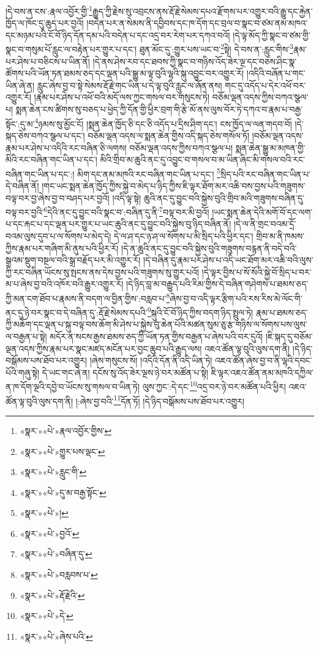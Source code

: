 །དེ་བས་ན་ངས་:རྣལ་འབྱོར་གྱི་\footnote{«སྣར་»«པེ་»རྣལ་འབྱོར་གྱིས་}རྒྱུད་ཀྱི་རྗེས་སུ་འབྲངས་ནས་རྡོ་རྗེ་སེམས་དཔའ་རྫོགས་པར་འགྱུར་བའི་རྒྱུ་དང་རྐྱེན་ཁྱོད་ལ་ཁོང་དུ་ཆུད་པར་བྱའོ། །བདེན་པར་ན་སེམས་ནི་དབྱིབས་དང་ཁ་དོག་དང་བྲལ་བ་སྣང་བ་ཙམ་ནམ་མཁའ་དང་མཉམ་པའི་ངོ་བོ་ཉིད་དོན་དམ་པའི་བདེན་པ་དང་འདྲ་བར་རེག་པར་དཀའ་བའོ། །དེ་ལྟ་མོད་ཀྱི་སྣང་བ་ཙམ་གྱི་སྣང་བ་གསུམ་པོ་རླུང་ལ་བརྟེན་པར་གྱུར་པ་དང་། ཐུན་མོང་དུ་:གྱུར་པས་ཡང་བ་\footnote{«སྣར་»«པེ་»གྱུར་པས་ལྡང་}སྟེ། དེ་བས་ན་:རླུང་གིས་\footnote{«སྣར་»«པེ་»རླུང་གི་}རྣམ་པར་ཤེས་པ་བཅིངས་པ་ཡིན་ནོ། །དེ་ནས་ཤེས་རབ་དང་ཐབས་ཀྱི་སྣང་བ་གཉིས་འོད་ཟེར་ལྔ་དང་བཅས་ཤིང་སྣ་ཚོགས་པའི་ཡོན་ཏན་ཐམས་ཅད་དང་ལྡན་པའི་སྒྱུ་མ་ལྟ་བུའི་ལྷའི་སྐུ་འབྱུང་བར་འགྱུར་རོ། །འདིའི་བཞོན་པ་གང་ཡིན་ཞེ་ན། རླུང་ཞེས་བྱ་བ་སྟེ་སེམས་རྡོ་རྗེ་གང་ཡིན་པ་དེ་ལྟ་བུའི་རླུང་ལ་ཞོན་ནས། གང་དུ་འདོད་པ་དེར་འཕོ་བར་འགྱུར་རོ། །རྣམ་པར་ཤེས་པ་འཕོ་བའི་མདོ་ལས་ཀྱང་གསལ་བར་གསུངས་ཏེ། བཅོམ་ལྡན་འདས་ཀྱིས་བཀའ་སྩལ་པ། སྨན་ཆེན་ངས་ཚིགས་སུ་བཅད་པ་ཕྱེད་ཀྱི་དོན་གྱི་ཕྱིར་བྲག་གི་རྩེ་མོ་ནས་ལུས་བོར་ཏེ་དཀའ་བ་རྣམ་པ་བརྒྱ་སྟོང་:དུ་མ་\footnote{«སྣར་»«པེ་»དུ་མ་བརྒྱ་སྟོང་}ཉམས་སུ་མྱོང་ངོ། །སྨན་ཆེན་ཁྱོད་ཅི་དང་ཅི་འདོད་པ་དྲིས་ཤིག་དང་། ངས་ཁྱོད་ལ་ལན་གདབ་བོ། །དེ་སྐད་ཅེས་བཀའ་སྩལ་པ་དང་། བཅོམ་ལྡན་འདས་ལ་སྨན་ཆེན་གྱིས་འདི་སྐད་ཅེས་གསོལ་ཏོ། །བཅོམ་ལྡན་འདས་རྣམ་པར་ཤེས་པ་འདིའི་རང་བཞིན་ཅི་ལགས། བཅོམ་ལྡན་འདས་ཀྱིས་བཀའ་སྩལ་པ། སྨན་ཆེན་སྒྱུ་མ་མཁན་གྱི་མིའི་རང་བཞིན་གང་ཡིན་པ་དང་། མིའི་གྲིབ་མ་ཆུའི་ནང་དུ་འབྱུང་བ་གསལ་བ་མ་ཡིན་ཞིང་མི་གསལ་བའི་རང་བཞིན་གང་ཡིན་པ་དང་:། མིག་དང་ནམ་མཁའི་རང་བཞིན་གང་ཡིན་པ་དང་། \footnote{«སྣར་»«པེ་»།  }སྲིད་པའི་རང་བཞིན་གང་ཡིན་པ་དེ་བཞིན་ནོ། །གང་ཡང་སྨན་ཆེན་ཁྱོད་ཀྱིས་སྐྱེ་བ་མེད་པ་ཉིད་ཀྱིས་ཇི་ལྟར་ཐོག་མར་འཆི་བས་བྱས་པའི་གཟུགས་བལྟ་བར་བྱ་ཞེས་བྱ་བ་བཤད་པར་བྱའོ། །འདི་ལྟ་སྟེ། ཆུའི་ནང་དུ་བྱུང་བའི་སྐྱེས་བུའི་གྲིབ་མའི་གཟུགས་བཞིན་དུ་བལྟ་བར་བྱའི་\footnote{«སྣར་»«པེ་»བྱའོ་}དེའི་ནང་དུ་བྱུང་བའི་སྣང་བ་:བཞིན་དུ་ནི་\footnote{«སྣར་»«པེ་»བཞིན་དུ་}བལྟ་བར་མི་བྱའོ། །ཡང་སྨན་ཆེན་དེའི་མགོ་བོ་དང་ལག་པ་དང་རྐང་པ་དང་ལྡན་པར་གྱུར་པ་ཡང་ཆུའི་ནང་དུ་བྱུང་བའི་སྐྱེས་བུ་ཉིད་བཞིན་ནོ། །དེ་ལ་ནི་གྲང་བའམ་དྲོ་བའམ་ལུས་དུབ་པ་ལ་སོགས་པ་མེད་དེ། དེ་ལ་ཤ་དང་ཉ་ཤ་ལ་སོགས་པ་མི་སྲིད་པའི་ཕྱིར་དང་། གྲིབ་མ་ནི་ཁམས་ཀྱིས་རྣམ་པར་གཞིག་མི་ནུས་པའི་ཕྱིར་རོ། །དེ་ན་ཆུའི་ནང་དུ་བྱུང་བའི་སྐྱེས་བུའི་གཟུགས་བརྙན་ནི་བདེ་བའི་སྒྲའམ་སྡུག་བསྔལ་བའི་སྒྲ་བརྗོད་པར་མི་འགྱུར་རོ། །དེ་བཞིན་དུ་རྣམ་པར་ཤེས་པ་འདི་ཡང་ཐོག་མར་འཆི་བའི་ལུས་ཀྱི་རང་བཞིན་ཡོངས་སུ་སྤངས་ནས་དེས་བྱས་པའི་གཟུགས་སུ་གྱུར་པའོ། །དེ་ལྟར་བྱིས་པ་སོ་སོའི་སྐྱེ་བོ་སྲིད་པ་བར་མ་པ་ཞེས་བྱ་བའི་འཁོར་བའི་རྒྱུར་འགྱུར་རོ། །དེ་ཉིད་བླ་མ་བརྒྱུད་པའི་རིམ་གྱིས་དེ་བཞིན་གཤེགས་པ་ཐམས་ཅད་ཀྱི་མན་ངག་ཐོབ་པ་རྣམས་ནི་བདག་ལ་བྱིན་གྱིས་:བརླབ་པ་\footnote{«སྣར་»«པེ་»བརླབས་པ་}ཞེས་བྱ་བ་འདི་ལྟར་རྩིག་པའི་རས་རིས་མེ་ལོང་གི་ནང་དུ་ཉེ་བར་སྣང་བ་དེ་བཞིན་དུ་:རྡོ་རྗེ་སེམས་དཔའི་\footnote{«སྣར་»«པེ་»རྡོ་རྗེའི་}སྐུའི་ངོ་བོ་ཉིད་ཀྱིས་བདག་ཉིད་སྤྲུལ་ཏེ། རྣམ་པ་ཐམས་ཅད་ཀྱི་མཆོག་དང་ལྡན་པ་སྐུ་བལྟ་བས་ཆོག་མི་ཤེས་པ་སྐྱེས་བུ་ཆེན་པོའི་མཚན་སུམ་ཅུ་རྩ་གཉིས་ལ་སོགས་པས་ལུས་ལ་བརྒྱན་པ་སྟེ། མདོར་ན་སངས་རྒྱས་ཐམས་ཅད་ཀྱི་ཡོན་ཏན་གྱིས་བརྒྱན་པ་ཞེས་པའི་བར་དུའོ། །ཇི་སྐད་དུ་བཅོམ་ལྡན་འདས་ཀྱིས་རྣམ་པར་སྣང་མཛད་མངོན་པར་བྱང་ཆུབ་པའི་རྒྱུད་ལས། འཇའ་ཚོན་ལྟ་བུའི་ལུས་དག་ནི། །དེ་ཉིད་བསྒོམས་པས་ཐོབ་པར་འགྱུར། །ཞེས་གསུངས་སོ། །འདིའི་དོན་ནི་འདི་ཡིན་ཏེ། འཇའ་ཚོན་ཞེས་བྱ་བ་ནི་ལྷའི་དབང་པོའི་གཞུ་སྟེ། དེ་ཡང་གང་ཞེ་ན། དངོས་སུ་འོད་ཟེར་ལྔས་ཉེ་བར་མཚོན་པ་སྟེ། ཇི་ལྟར་འཇའ་ཚོན་ནམ་མཁའི་དཀྱིལ་ན་ཁ་དོག་ལྔའི་དབྱེ་བ་ཡོངས་སུ་གསལ་བ་ཡིན་ཏེ། ལུས་ཀྱང་:དེ་དང་\footnote{«སྣར་»«པེ་»དེ་}འདྲ་བར་ཉེ་བར་མཚོན་པའི་ཕྱིར། འཇའ་ཚོན་ལྟ་བུའི་ལུས་དག་ནི། །:ཞེས་བྱ་བའི་\footnote{«སྣར་»«པེ་»ཞེས་པའི་}དོན་ཏོ། །དེ་ཉིད་བསྒོམས་པས་ཐོབ་པར་འགྱུར། 